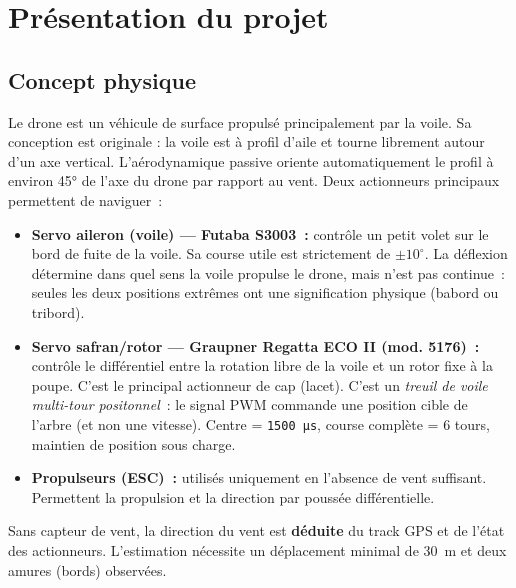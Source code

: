 \documentclass[12pt,a4paper]{article}
\newcommand{\us}[1]{\texttt{#1\,µs}}
\begin{document}
\section{Présentation du projet}

\subsection{Concept physique}

Le drone est un véhicule de surface propulsé principalement par la voile. Sa
conception est originale : la voile est à profil d'aile et tourne librement
autour d'un axe vertical. L'aérodynamique passive oriente automatiquement le
profil à environ 45° de l'axe du drone par rapport au vent. Deux actionneurs
principaux permettent de naviguer~:

\begin{itemize}
  \item \textbf{Servo aileron (voile) — Futaba S3003~:} contrôle un petit volet
    sur le bord de fuite de la voile. Sa course utile est strictement de
    $\pm10^{\circ}$. La déflexion détermine dans quel sens la voile propulse le drone,
    mais n'est pas continue~: seules les deux positions extrêmes ont une
    signification physique (babord ou tribord).

  \item \textbf{Servo safran/rotor — Graupner Regatta ECO II (mod. 5176)~:}
    contrôle le différentiel entre la rotation libre de la voile et un rotor
    fixe à la poupe. C'est le principal actionneur de cap (lacet). C'est un
    \emph{treuil de voile multi-tour positonnel}~: le signal PWM commande une
    position cible de l'arbre (et non une vitesse). Centre = \us{1500},
    course complète = 6 tours, maintien de position sous charge.

  \item \textbf{Propulseurs (ESC)~:} utilisés uniquement en l'absence de vent
    suffisant. Permettent la propulsion et la direction par poussée différentielle.
\end{itemize}

\begin{infobox}
  Sans capteur de vent, la direction du vent est \textbf{déduite} du track GPS
  et de l'état des actionneurs. L'estimation nécessite un déplacement minimal
  de 30~m et deux amures (bords) observées.
\end{infobox}
\end{document}

